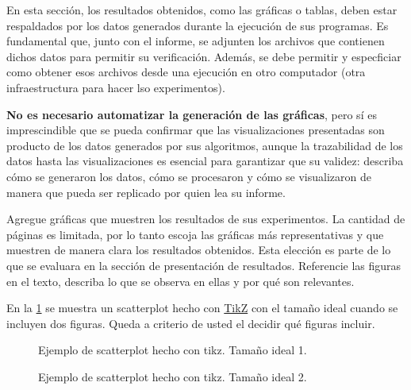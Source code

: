 
























En esta sección, los resultados obtenidos, como las gráficas o tablas, deben estar respaldados por los datos generados durante la ejecución de sus programas. Es fundamental que, junto con el informe, se adjunten los archivos que contienen dichos datos para permitir su verificación. Además, se debe permitir y especficiar como obtener esos archivos desde una ejecución en otro computador (otra infraestructura para hacer lso experimentos).

\textbf{No es necesario automatizar la generación de las gráficas}, pero sí es imprescindible que se pueda confirmar que las visualizaciones presentadas son producto de los datos generados por sus algoritmos, aunque la trazabilidad de los datos hasta las visualizaciones es esencial para garantizar que su validez: describa cómo se generaron los datos, cómo se procesaron y cómo se visualizaron de manera que pueda ser replicado por quien lea su informe.

Agregue gráficas que muestren los resultados de sus experimentos. La cantidad de páginas es limitada, por lo tanto escoja las gráficas más representativas y que muestren de manera clara los resultados obtenidos. Esta elección es parte de lo que se evaluara en la sección de presentación de resultados. Referencie las figuras en el texto, describa lo que se observa en ellas y por qué son relevantes.

En la \cref{fig:scatterplot_1} se muestra un scatterplot hecho con \href{https://es.overleaf.com/learn/latex/TikZ_package}{TikZ} con el tamaño ideal cuando se incluyen dos figuras. Queda a criterio de usted el decidir qué figuras incluir.

\begin{figure}[H]
    \centering
    
    \caption{Ejemplo de scatterplot hecho con tikz. Tamaño ideal 1.}
    \label{fig:scatterplot_1}
\end{figure}


\begin{figure}[H]
    \centering
    \begin{minipage}[t]{0.5\textwidth}
    
    \end{minipage}%
    \begin{minipage}[t]{0.5\textwidth}
    
    \end{minipage}%
    \caption{Ejemplo de scatterplot hecho con tikz. Tamaño ideal 2.}
    \label{fig:scatterplot_2}
\end{figure}

